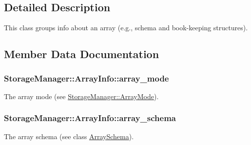 \subsection{Detailed Description}
This class groups info about an array (e.\+g., schema and book-\/keeping structures). 

\subsection{Member Data Documentation}
\hypertarget{classStorageManager_1_1ArrayInfo_aa56b9a598dc49aee081be262b0963cb8}{}
\subsubsection[{array\+\_\+mode}]{ Storage\+Manager\+::\+Array\+Info\+::array\+\_\+mode\hspace{0.3cm}{\ttfamily [private]}}\label{classStorageManager_1_1ArrayInfo_aa56b9a598dc49aee081be262b0963cb8}
The array mode (see \hyperlink{classStorageManager_a283b60c689883bc7c343ffbf1de8fc3d}{Storage\+Manager\+::\+Array\+Mode}). \hypertarget{classStorageManager_1_1ArrayInfo_a60ab57f41b311d2d4a43e13b3a5f724b}{}
\subsubsection[{array\+\_\+schema}]{ Storage\+Manager\+::\+Array\+Info\+::array\+\_\+schema\hspace{0.3cm}{\ttfamily [private]}}\label{classStorageManager_1_1ArrayInfo_a60ab57f41b311d2d4a43e13b3a5f724b}
The array schema (see class \hyperlink{classArraySchema}{Array\+Schema}). \hypertarget{classStorageManager_1_1ArrayInfo_a3c8572cbfe484d51eaad76691df35307}{}
